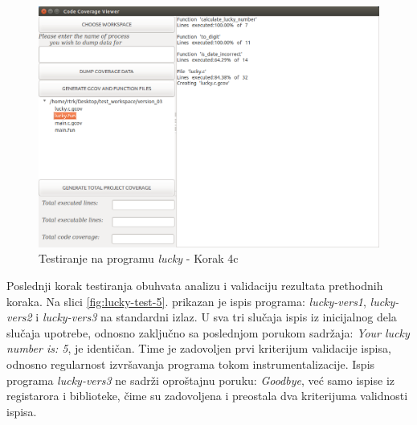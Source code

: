 \documentclass[12pt,oneside]{memoir}
\newcommand{\strano}[1]{\textit{#1}}
\begin{document}
\begin{figure}[!ht]
  \centering
  \includegraphics[width=\textwidth]{img/lucky4-ng-ng.png}
  \caption{Testiranje na programu \strano{lucky} - Korak 4c}
  \label{fig:lucky-test-4}
\end{figure}

Poslednji korak testiranja obuhvata analizu i validaciju rezultata prethodnih koraka. Na slici \ref{fig:lucky-test-5}. prikazan je ispis programa: \strano{lucky-vers1}, \strano{lucky-vers2} i \strano{lucky-vers3} na standardni izlaz. U sva tri slučaja ispis iz inicijalnog dela slučaja upotrebe, odnosno zaključno sa poslednjom porukom sadržaja: \strano{Your lucky number is: 5}, je identičan. Time je zadovoljen prvi kriterijum validacije ispisa, odnosno regularnost izvršavanja programa tokom instrumentalizacije. Ispis programa \strano{lucky-vers3} ne sadrži oproštajnu poruku: \strano{Goodbye}, već samo ispise iz registarora i biblioteke, čime su zadovoljena i preostala dva kriterijuma validnosti ispisa. 
\end{document}
